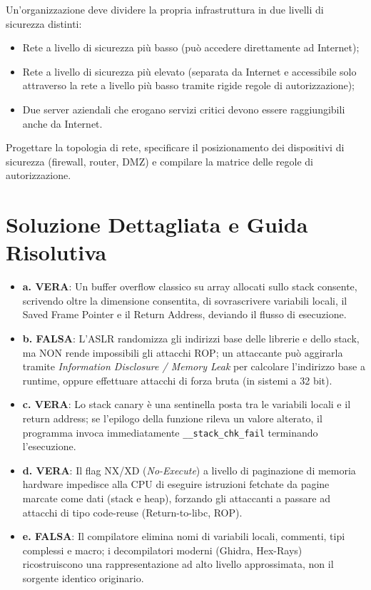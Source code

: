 \documentclass[11pt,a4paper]{article}
\begin{document}
\begin{questionbox}
Un'organizzazione deve dividere la propria infrastruttura in due livelli di sicurezza distinti:
\begin{itemize}
    \item Rete a livello di sicurezza pi\`u basso (pu\`o accedere direttamente ad Internet);
    \item Rete a livello di sicurezza pi\`u elevato (separata da Internet e accessibile solo attraverso la rete a livello pi\`u basso tramite rigide regole di autorizzazione);
    \item Due server aziendali che erogano servizi critici devono essere raggiungibili anche da Internet.
\end{itemize}
Progettare la topologia di rete, specificare il posizionamento dei dispositivi di sicurezza (firewall, router, DMZ) e compilare la matrice delle regole di autorizzazione.
\end{questionbox}

\newpage
\section{Soluzione Dettagliata e Guida Risolutiva}

\begin{solutionbox}
\begin{itemize}
    \item \textbf{a. VERA}: Un buffer overflow classico su array allocati sullo stack consente, scrivendo oltre la dimensione consentita, di sovrascrivere variabili locali, il Saved Frame Pointer e il Return Address, deviando il flusso di esecuzione.
    \item \textbf{b. FALSA}: L'ASLR randomizza gli indirizzi base delle librerie e dello stack, ma NON rende impossibili gli attacchi ROP; un attaccante pu\`o aggirarla tramite \textit{Information Disclosure / Memory Leak} per calcolare l'indirizzo base a runtime, oppure effettuare attacchi di forza bruta (in sistemi a 32 bit).
    \item \textbf{c. VERA}: Lo stack canary \`e una sentinella posta tra le variabili locali e il return address; se l'epilogo della funzione rileva un valore alterato, il programma invoca immediatamente \texttt{\_\_stack\_chk\_fail} terminando l'esecuzione.
    \item \textbf{d. VERA}: Il flag NX/XD (\textit{No-Execute}) a livello di paginazione di memoria hardware impedisce alla CPU di eseguire istruzioni fetchate da pagine marcate come dati (stack e heap), forzando gli attaccanti a passare ad attacchi di tipo code-reuse (Return-to-libc, ROP).
    \item \textbf{e. FALSA}: Il compilatore elimina nomi di variabili locali, commenti, tipi complessi e macro; i decompilatori moderni (Ghidra, Hex-Rays) ricostruiscono una rappresentazione ad alto livello approssimata, non il sorgente identico originario.
\end{itemize}
\end{solutionbox}
\end{document}
